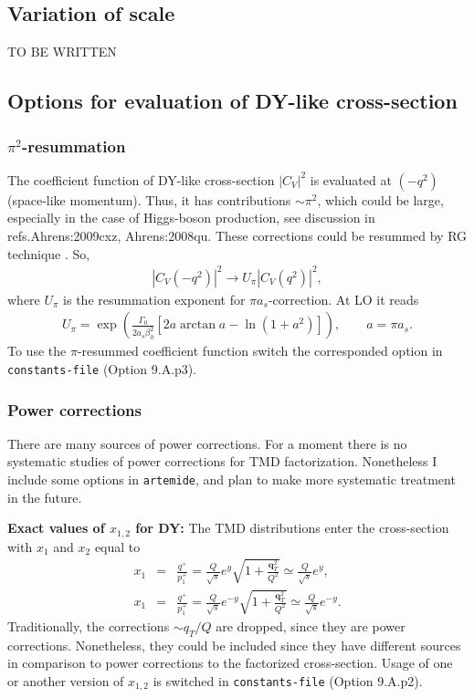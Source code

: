 \documentclass[prd,nofootinbib,eqsecnum,final]{revtex4}
\newcommand{\nn}{\nonumber}
\renewcommand{\(}{\left(}
\renewcommand{\)}{\right)}
\renewcommand{\[}{\left[}
\renewcommand{\]}{\right]}
\renewcommand{\vec}[1]{\bm{#1}}
\begin{document}
\subsection{Variation of scale}
\label{TMDX:c2}

TO BE WRITTEN

\subsection{Options for evaluation of DY-like cross-section}

\subsubsection{$\pi^2$-resummation}

The coefficient function of DY-like cross-section $|C_V|^2$ is evaluated at $(-q^2)$ (space-like momentum). Thus, it has contributions $\sim \pi^2$, which could be large, especially in the case of Higgs-boson production, see discussion in  refs.{Ahrens:2009cxz, Ahrens:2008qu}. These corrections could be resummed by RG technique \cite{Ahrens:2008qu}. So,
\begin{eqnarray}
|C_V(-q^2)|^2\to U_\pi |C_V(q^2)|^2,
\end{eqnarray}
where $U_\pi$ is the resummation exponent for $\pi a_s$-correction. At LO it reads \cite{Ahrens:2008qu}
\begin{eqnarray}
U_\pi=\exp\(\frac{\Gamma_0}{2a_s\beta_0^2}[2 a \arctan a-\ln(1+a^2)]\),\qquad a=\pi a_s.
\end{eqnarray}
To use the $\pi$-resummed coefficient function switch the corresponded option in \texttt{constants-file} (Option 9.A.p3).

\subsubsection{Power corrections}

There are many sources of power corrections. For a moment there is no systematic studies of power corrections for TMD factorization. Nonetheless I include some options in \texttt{artemide}, and plan to make more systematic treatment in the future.

\textbf{Exact values of $x_{1,2}$ for DY:} The TMD distributions enter the cross-section with $x_1$ and $x_2$ equal to
\begin{eqnarray}
x_1&=&\frac{q^+}{p_1^+}=\frac{Q}{\sqrt{s}}e^y\sqrt{1+\frac{\vec q_T^2}{Q^2}}\simeq \frac{Q}{\sqrt{s}}e^y,
\\\nn
x_1&=&\frac{q^+}{p_1^+}=\frac{Q}{\sqrt{s}}e^{-y}\sqrt{1+\frac{\vec q_T^2}{Q^2}} \simeq \frac{Q}{\sqrt{s}}e^{-y}.
\end{eqnarray}
Traditionally, the corrections $\sim q_T/Q$ are dropped, since they are power corrections. Nonetheless, they could be included since they have different sources in comparison to power corrections to the factorized cross-section. Usage of one or another version of $x_{1,2}$ is switched in \texttt{constants-file} (Option 9.A.p2).
\end{document}
